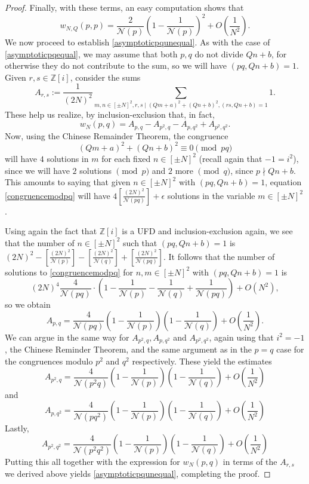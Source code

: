 \documentclass[11pt]{amsart}
\theoremstyle{definition}
\newcommand{\NN}{{\mathcal N}}
\newcommand{\Z}{{\mathbb Z}}
\begin{document}
\begin{proof}
Finally, with these terms, an easy computation shows that
\[
w_{N,Q}(p,p) = \frac{2}{\NN(p)}\left( 1-\frac{1}{\NN(p)}\right)^2+O\left(\frac{1}{N^2}\right).
\]
We now proceed to establish \eqref{asymptoticpqunequal}. As with the case of \eqref{asymptoticpqequal}, we may assume that both $p, q$ do not divide $Qn+b$, for otherwise they do not contribute to the sum, so we will have $(pq, Qn+b)=1$. Given $r, s \in \Z[i]$, consider the sums
\[
A_{r,s}:=\frac{1}{(2N)^2}\sum_{m, n \in [\pm N]^2, r,s \mid (Qm+a)^2+(Qn+b)^2,  (rs,Qn+b)=1}1.
\]
These help us realize, by inclusion-exclusion that, in fact,
\[
w_{N}(p,q)=A_{p,q}-A_{p^2,q}-A_{p,q^2}+A_{p^2,q^2}.
\]
Now, using the Chinese Remainder Theorem, the congruence
\begin{equation}\label{congruencemodpq}
(Qm+a)^2+(Qn+b)^2 \equiv 0 \pmod{pq}
\end{equation}
will have $4$ solutions in $m$ for each fixed $n \in [\pm N]^2$ (recall again that $-1=i^2$), since we will have $2$ solutions $\pmod p$ and $2$ more $\pmod q$, since $p \nmid Qn+b$. This amounts to saying that given $n \in [\pm N]^2$ with $(pq, Qn+b)=1$, equation \eqref{congruencemodpq} will have $4\left[ \frac{(2N)^2}{\NN(pq)} \right]+\epsilon$ solutions in the variable $m \in [\pm N]^2$. 

Using again the fact that $\Z[i]$ is a UFD and inclusion-exclusion again, we see that the number of $n \in [\pm N]^2$ such that $(pq, Qn+b)=1$ is $(2N)^2-\left[\frac{(2N)^2}{\NN(p)}\right]-\left[\frac{(2N)^2}{\NN(q)}\right]+\left[\frac{(2N)^2}{\NN(pq)}\right]$. It follows that the number of solutions to \eqref{congruencemodpq} for $n, m \in [\pm N]^2$ with $(pq, Qn+b)=1$ is
\[
(2N)^4\frac{4}{\NN(pq)}\cdot \left( 1-\frac{1}{\NN(p)}-\frac{1}{\NN(q)}+\frac{1}{\NN(pq)}\right)+O(N^2), 
\]
so we obtain
\[
A_{p,q} = \frac{4}{\NN(pq)}\left(1-\frac{1}{\NN(p)}\right)\left(1-\frac{1}{\NN(q)}\right)+O\left(\frac{1}{N^2}\right).
\]
We can argue in the same way for $A_{p^2,q}, A_{p,q^2}$ and $A_{p^2,q^2}$, again using that $i^2=-1$, the Chinese Reminder Theorem, and the same argument as in the $p=q$ case for the congruences modulo $p^2$ and $q^2$ respectively. These yield the estimates
\[
A_{p^2,q} = \frac{4}{\NN(p^2q)}\left(1-\frac{1}{\NN(p)}\right)\left(1-\frac{1}{\NN(q)}\right)+O\left(\frac{1}{N^2}\right)
\]
and
\[
A_{p,q^2} = \frac{4}{\NN(pq^2)}\left(1-\frac{1}{\NN(p)}\right)\left(1-\frac{1}{\NN(q)}\right)+O\left(\frac{1}{N^2}\right)
\]
Lastly,
\[
A_{p^2,q^2} = \frac{4}{\NN(p^2q^2)}\left(1-\frac{1}{\NN(p)}\right)\left(1-\frac{1}{\NN(q)}\right)+O\left(\frac{1}{N^2}\right)
\]
Putting this all together with the expression for $w_N(p,q)$ in terms of the $A_{r,s}$ we derived above yields \eqref{asymptoticpqunequal}, completing the proof.
\end{proof}
\end{document}
